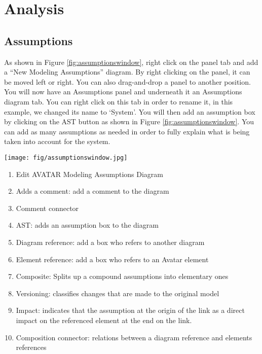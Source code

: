 \documentclass[12pt]{article}
\begin{document}
\section{Analysis}
\subsection{Assumptions}

As shown in Figure \ref{fig:assumptionswindow}, right click on the panel tab and add a “New Modeling Assumptions” diagram. By right clicking on the panel, it can be moved left or right. You can also drag-and-drop a panel to another position. You will now have an Assumptions panel and underneath it an Assumptions diagram tab. You can right click on this tab in order to rename it, in this example, we changed its name to ‘System’. You will then add an assumption box by clicking on the AST button as shown in Figure \ref{fig:assumptionswindow}. You can add as many assumptions as needed in order to fully explain what is being taken into account for the system. 

\begin{figure*}[htbp]
\centering
\texttt{[image: fig/assumptionswindow.jpg]}
\caption{Assumptions Window} \label{fig:assumptionswindow}
\end{figure*}

\begin{enumerate}
\item Edit AVATAR Modeling Assumptions Diagram
\item  Adds a comment: add a comment to the diagram
\item  Comment connector
\item  AST: adds an assumption box to the diagram
\item  Diagram reference: add a box who refers to another diagram
\item  Element reference: add a box who refers to an Avatar element
\item  Composite: Splits up a compound assumptions into elementary ones
\item  Versioning: classifies changes that are made to the original model
\item  Impact: indicates that the assumption at the origin of the link as a direct impact on the referenced element at the end on the link. 
\item Composition connector: relations between a diagram reference and elements references
\end{enumerate}
\end{document}
